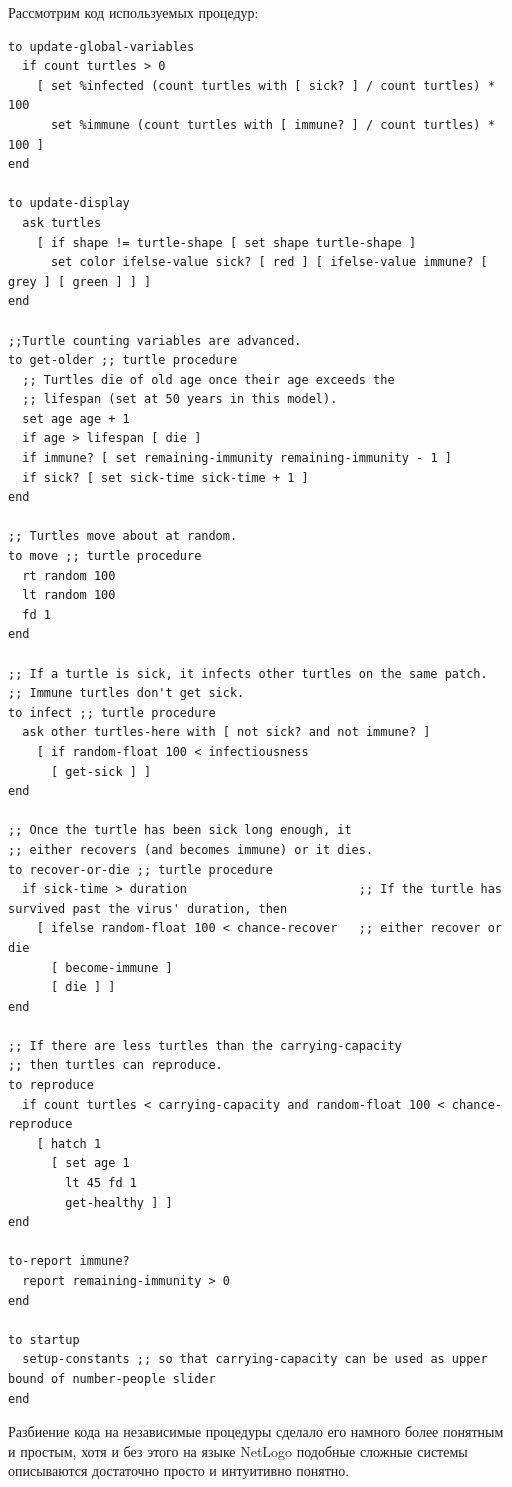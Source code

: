 \documentclass[14pt,a4paper,report]{report}
\begin{document}
Рассмотрим код используемых процедур:
\begin{verbatim}
to update-global-variables
  if count turtles > 0
    [ set %infected (count turtles with [ sick? ] / count turtles) * 100
      set %immune (count turtles with [ immune? ] / count turtles) * 100 ]
end

to update-display
  ask turtles
    [ if shape != turtle-shape [ set shape turtle-shape ]
      set color ifelse-value sick? [ red ] [ ifelse-value immune? [ grey ] [ green ] ] ]
end

;;Turtle counting variables are advanced.
to get-older ;; turtle procedure
  ;; Turtles die of old age once their age exceeds the
  ;; lifespan (set at 50 years in this model).
  set age age + 1
  if age > lifespan [ die ]
  if immune? [ set remaining-immunity remaining-immunity - 1 ]
  if sick? [ set sick-time sick-time + 1 ]
end

;; Turtles move about at random.
to move ;; turtle procedure
  rt random 100
  lt random 100
  fd 1
end

;; If a turtle is sick, it infects other turtles on the same patch.
;; Immune turtles don't get sick.
to infect ;; turtle procedure
  ask other turtles-here with [ not sick? and not immune? ]
    [ if random-float 100 < infectiousness
      [ get-sick ] ]
end

;; Once the turtle has been sick long enough, it
;; either recovers (and becomes immune) or it dies.
to recover-or-die ;; turtle procedure
  if sick-time > duration                        ;; If the turtle has survived past the virus' duration, then
    [ ifelse random-float 100 < chance-recover   ;; either recover or die
      [ become-immune ]
      [ die ] ]
end

;; If there are less turtles than the carrying-capacity
;; then turtles can reproduce.
to reproduce
  if count turtles < carrying-capacity and random-float 100 < chance-reproduce
    [ hatch 1
      [ set age 1
        lt 45 fd 1
        get-healthy ] ]
end

to-report immune?
  report remaining-immunity > 0
end

to startup
  setup-constants ;; so that carrying-capacity can be used as upper bound of number-people slider
end
\end{verbatim}

Разбиение кода на независимые процедуры сделало его намного более понятным и простым, хотя и без этого на языке NetLogo подобные сложные системы описываются достаточно просто и интуитивно понятно.
\end{document}

